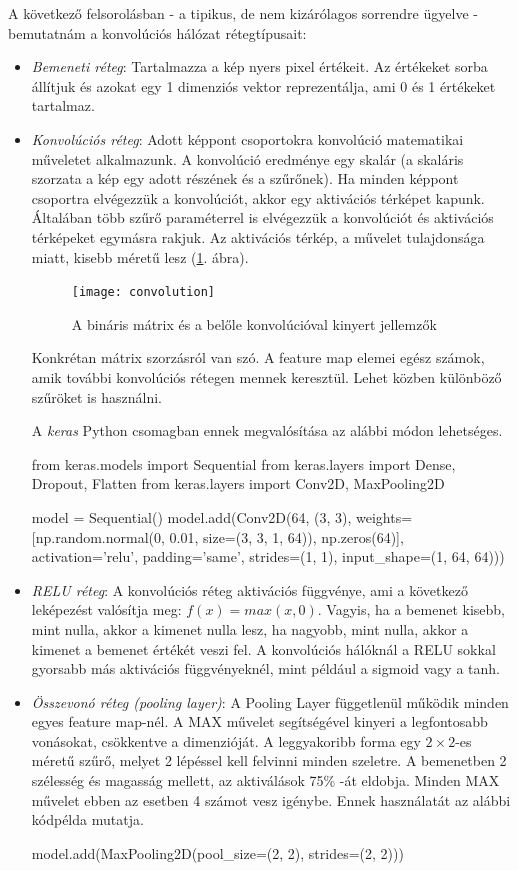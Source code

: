 A következő felsorolásban - a tipikus, de nem kizárólagos sorrendre ügyelve - bemutatnám a konvolúciós hálózat rétegtípusait:

\begin{itemize}
\item \textit{Bemeneti réteg}: Tartalmazza a kép nyers pixel értékeit. Az értékeket sorba állítjuk és azokat egy 1 dimenziós vektor reprezentálja, ami 0 és 1 értékeket tartalmaz.

\item \textit{Konvolúciós réteg}: Adott képpont csoportokra konvolúció matematikai műveletet alkalmazunk. A konvolúció eredménye egy skalár (a skaláris szorzata a kép egy adott részének és a szűrőnek). Ha minden képpont csoportra elvégezzük a konvolúciót, akkor egy aktivációs térképet kapunk. Általában több szűrő paraméterrel is elvégezzük a konvolúciót és aktivációs térképeket egymásra rakjuk. Az aktivációs térkép, a művelet tulajdonsága miatt, kisebb
méretű lesz (\ref{fig:convolution}. ábra).

\begin{figure}
\centering
\texttt{[image: convolution]}
\caption{A bináris mátrix és a belőle konvolúcióval kinyert jellemzők}
\label{fig:convolution}
\end{figure}

Konkrétan mátrix szorzásról van szó. A feature map elemei egész számok, amik további konvolúciós rétegen mennek keresztül. Lehet közben különböző szűröket is használni.

A \textit{keras} Python csomagban ennek megvalósítása az alábbi módon lehetséges.
\begin{python}
from keras.models import Sequential
from keras.layers import Dense, Dropout, Flatten
from keras.layers import Conv2D, MaxPooling2D

model = Sequential()
model.add(Conv2D(64, (3, 3),
	weights=[np.random.normal(0, 0.01,
	size=(3, 3, 1, 64)), np.zeros(64)],
	activation='relu', padding='same',
	strides=(1, 1),
	input_shape=(1, 64, 64)))
\end{python}

\item \textit{RELU réteg}: A konvolúciós réteg aktivációs függvénye, ami a következő leképezést valósítja meg: $f(x) = max(x, 0)$. Vagyis, ha a bemenet kisebb, mint nulla, akkor a kimenet nulla lesz, ha nagyobb, mint nulla, akkor a kimenet a bemenet értékét veszi fel. A konvolúciós hálóknál a RELU sokkal gyorsabb más aktivációs függvényeknél, mint például a sigmoid vagy a tanh.
\item \textit{Összevonó réteg (pooling layer)}: A Pooling Layer függetlenül működik minden egyes feature map-nél. A MAX művelet segítségével kinyeri a legfontosabb vonásokat, csökkentve a dimenzióját. A leggyakoribb forma egy $2 \times 2$-es méretű szűrő, melyet 2 lépéssel kell felvinni minden szeletre. A bemenetben 2 szélesség és magasság mellett, az aktiválások 75\% -át eldobja. Minden MAX művelet ebben az esetben 4 számot vesz igénybe. Ennek használatát az alábbi kódpélda mutatja.
\begin{python}
model.add(MaxPooling2D(pool_size=(2, 2), strides=(2, 2)))
\end{python}


\end{itemize}
